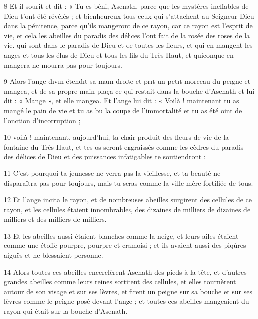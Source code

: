 \par 8 Et il sourit et dit : « Tu es béni, Asenath, parce que les mystères ineffables de Dieu t'ont été révélés ; et bienheureux tous ceux qui s'attachent au Seigneur Dieu dans la pénitence, parce qu'ils mangeront de ce rayon, car ce rayon est l'esprit de vie, et cela les abeilles du paradis des délices l'ont fait de la rosée des roses de la vie. qui sont dans le paradis de Dieu et de toutes les fleurs, et qui en mangent les anges et tous les élus de Dieu et tous les fils du Très-Haut, et quiconque en mangera ne mourra pas pour toujours.

\par 9 Alors l'ange divin étendit sa main droite et prit un petit morceau du peigne et mangea, et de sa propre main plaça ce qui restait dans la bouche d'Asenath et lui dit : « Mange », et elle mangea. Et l'ange lui dit : « Voilà ! maintenant tu as mangé le pain de vie et tu as bu la coupe de l'immortalité et tu as été oint de l'onction d'incorruption ;

\par 10 voilà ! maintenant, aujourd'hui, ta chair produit des fleurs de vie de la fontaine du Très-Haut, et tes os seront engraissés comme les cèdres du paradis des délices de Dieu et des puissances infatigables te soutiendront ;

\par 11 C'est pourquoi ta jeunesse ne verra pas la vieillesse, et ta beauté ne disparaîtra pas pour toujours, mais tu seras comme la ville mère fortifiée de tous.

\par 12 Et l'ange incita le rayon, et de nombreuses abeilles surgirent des cellules de ce rayon, et les cellules étaient innombrables, des dizaines de milliers de dizaines de milliers et des milliers de milliers.

\par 13 Et les abeilles aussi étaient blanches comme la neige, et leurs ailes étaient comme une étoffe pourpre, pourpre et cramoisi ; et ils avaient aussi des piqûres aiguës et ne blessaient personne.

\par 14 Alors toutes ces abeilles encerclèrent Asenath des pieds à la tête, et d'autres grandes abeilles comme leurs reines sortirent des cellules, et elles tournèrent autour de son visage et sur ses lèvres, et firent un peigne sur sa bouche et sur ses lèvres comme le peigne posé devant l'ange ; et toutes ces abeilles mangeaient du rayon qui était sur la bouche d'Asenath.

